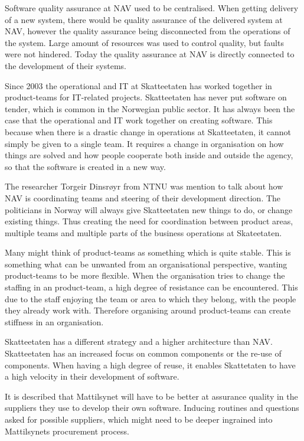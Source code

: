 Software quality assurance at NAV used to be centralised. When getting delivery of a new system, there would be quality assurance of the delivered system at NAV, however the quality assurance being disconnected from the operations of the system. Large amount of resources was used to control quality, but faults were not hindered. Today the quality assurance at NAV is directly connected to the development of their systems.

Since 2003 the operational and IT at Skatteetaten has worked together in product-teams for IT-related projects. Skatteetaten has never put software on tender, which is common in the Norwegian public sector. It has always been the case that the operational and IT work together on creating software. This because when there is a drastic change in operations at Skatteetaten, it cannot simply be given to a single team. It requires a change in organisation on how things are solved and how people cooperate both inside and outside the agency, so that the software is created in a new way.

The researcher Torgeir Dinsrøyr from NTNU was mention to talk about how NAV is coordinating teams and steering of their development direction. The politicians in Norway will always give Skatteetaten new things to do, or change existing things. Thus creating the need for coordination between product areas, multiple teams and multiple parts of the business operations at Skateetaten.

Many might think of product-teams as something which is quite stable. This is something what can be unwanted from an organisational perspective, wanting product-teams to be more flexible. When the organisation tries to change the staffing in an product-team, a high degree of resistance can be encountered. This due to the staff enjoying the team or area to which they belong, with the people they already work with. Therefore organising around product-teams can create stiffness in an organisation.

Skatteetaten has a different strategy and a higher architecture than NAV. Skatteetaten has an increased focus on common components or the re-use of components. When having a high degree of reuse, it enables Skattetaten to have a high velocity in their development of software.

It is described that Mattilsynet will have to be better at assurance quality in the suppliers they use to develop their own software. Inducing routines and questions asked for possible suppliers, which might need to be deeper ingrained into Mattilsynets procurement process.

